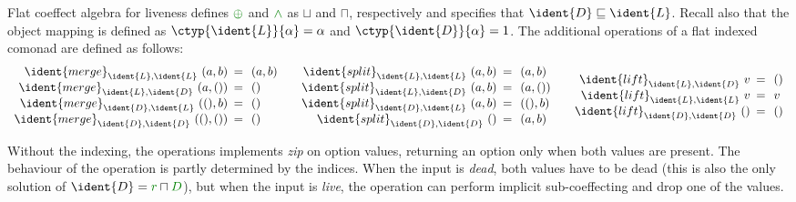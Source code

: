 \begin{example}
Flat coeffect algebra for liveness defines $\cpar$ and $\czip$ as $\sqcup$ and $\sqcap$, respectively 
and specifies that $\ident{D} \sqsubseteq \ident{L}$. Recall also that the object mapping is defined 
as $\ctyp{\ident{L}}{\alpha} = \alpha$ and $\ctyp{\ident{D}}{\alpha} = 1$. The additional operations 
of a flat indexed comonad are defined as follows:
%
\begin{equation*}
\begin{array}{rcl}
\ident{merge}_{\ident{L}, \ident{L}}~(a, b) &\narrow{=}& (a, b)\\
\ident{merge}_{\ident{L}, \ident{D}}~(a, ()) &\narrow{=}& ()\\
\ident{merge}_{\ident{D}, \ident{L}}~((), b) &\narrow{=}& ()\\
\ident{merge}_{\ident{D}, \ident{D}}~((), ()) &\narrow{=}& ()\\
\end{array}
\quad
\begin{array}{rcl}
\ident{split}_{\ident{L}, \ident{L}}~(a, b) &\narrow{=}& (a, b)\\
\ident{split}_{\ident{L}, \ident{D}}~(a, b) &\narrow{=}& (a, ())\\
\ident{split}_{\ident{D}, \ident{L}}~(a, b) &\narrow{=}& ((), b)\\
\ident{split}_{\ident{D}, \ident{D}}~() &\narrow{=}& (a, b)\\
\end{array}
\quad
\begin{array}{rcl}
\ident{lift}_{\ident{L}, \ident{D}}~v &\narrow{=}& ()\\
\ident{lift}_{\ident{L}, \ident{L}}~v &\narrow{=}& v\\
\ident{lift}_{\ident{D}, \ident{D}}~() &\narrow{=}& ()\\
\end{array}
\end{equation*}
\end{example}

\noindent
Without the indexing, the  operations implements \emph{zip} on option values,
returning an option only when both values are present. The behaviour of the  
operation is partly determined by the indices. When the input is \emph{dead}, both values have 
to be dead (this is also the only solution of $\ident{D}=\cclrd{r}\sqcap\cclrd{D}$), but when
the input is \emph{live}, the operation can perform implicit sub-coeffecting and drop one of
the values.

